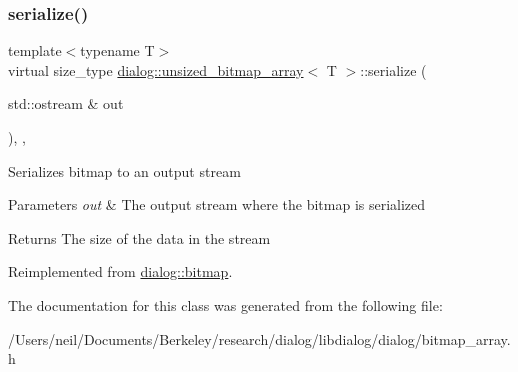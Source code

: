 \subsubsection{\texorpdfstring{serialize()}{serialize()}}
{\footnotesize\ttfamily template$<$typename T$>$ \\
virtual size\+\_\+type \hyperlink{classdialog_1_1unsized__bitmap__array}{dialog\+::unsized\+\_\+bitmap\+\_\+array}$<$ T $>$\+::serialize (\begin{DoxyParamCaption}\item[{std\+::ostream \&}]{out }\end{DoxyParamCaption})\hspace{0.3cm}{\ttfamily [inline]}, {\ttfamily [override]}, {\ttfamily [virtual]}}

Serializes bitmap to an output stream 
\begin{DoxyParams}{Parameters}
{\em out} & The output stream where the bitmap is serialized \\
\hline
\end{DoxyParams}
\begin{DoxyReturn}{Returns}
The size of the data in the stream 
\end{DoxyReturn}


Reimplemented from \hyperlink{classdialog_1_1bitmap_af93ff2660d3b790eee85692a41bdb823}{dialog\+::bitmap}.



The documentation for this class was generated from the following file\+:\begin{DoxyCompactItemize}
\item 
/\+Users/neil/\+Documents/\+Berkeley/research/dialog/libdialog/dialog/bitmap\+\_\+array.\+h\end{DoxyCompactItemize}
